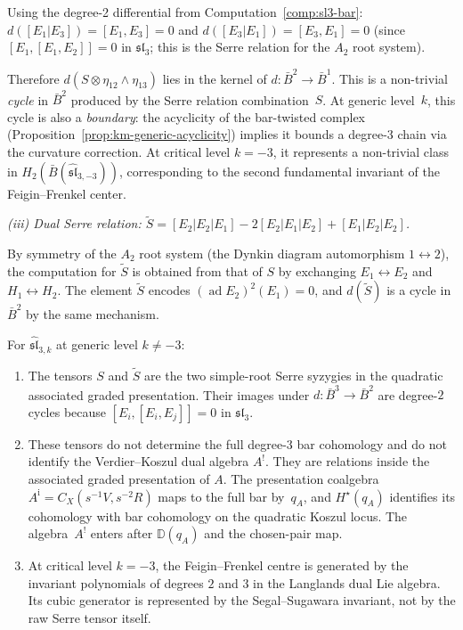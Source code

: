 \begin{computation}
Using the degree-2 differential from Computation~\ref{comp:sl3-bar}:
$d([E_1|E_3]) = [E_1, E_3] = 0$ and $d([E_3|E_1]) = [E_3, E_1] = 0$
(since $[E_1, [E_1, E_2]] = 0$ in $\mathfrak{sl}_3$; this is the
Serre relation for the $A_2$ root system).

Therefore $d(S \otimes \eta_{12}\wedge\eta_{13})$ lies in the kernel of
$d\colon \bar{B}^2 \to \bar{B}^1$. This is a non-trivial \emph{cycle}
in $\bar{B}^2$ produced by the Serre relation combination~$S$. At generic
level~$k$, this cycle is also a \emph{boundary}: the acyclicity
of the bar-twisted complex (Proposition~\ref{prop:km-generic-acyclicity})
implies it bounds a degree-3 chain via the curvature correction. At
critical level $k = -3$, it represents a non-trivial class in
$H_2(\bar{B}(\widehat{\mathfrak{sl}}_{3,-3}))$, corresponding to the
second fundamental invariant of the Feigin--Frenkel center.

\emph{(iii) Dual Serre relation:
$\tilde{S} = [E_{2}|E_{2}|E_{1}] - 2[E_{2}|E_{1}|E_{2}]
+ [E_{1}|E_{2}|E_{2}]$.}

By symmetry of the $A_2$ root system (the Dynkin diagram automorphism
$1 \leftrightarrow 2$), the computation for $\tilde{S}$ is obtained from
that of $S$ by exchanging $E_1 \leftrightarrow E_2$ and
$H_1 \leftrightarrow H_2$. The element $\tilde{S}$ encodes
$(\operatorname{ad} E_2)^2(E_1) = 0$, and $d(\tilde{S})$ is a cycle
in $\bar{B}^2$ by the same mechanism.
\end{computation}

\begin{proposition}
\label{prop:sl3-serre-cohomology}
For $\widehat{\mathfrak{sl}}_{3,k}$ at generic level $k \neq -3$:
\begin{enumerate}[label=\textup{(\roman*)}]
\item The tensors $S$ and $\tilde S$ are the two simple-root Serre
syzygies in the quadratic associated graded presentation. Their
images under $d\colon \bar{B}^3\to\bar{B}^2$ are degree-$2$ cycles
because $[E_i,[E_i,E_j]]=0$ in $\mathfrak{sl}_3$.
\item These tensors do not determine the full degree-$3$ bar
cohomology and do not identify the Verdier--Koszul dual algebra
$A^!$. They are relations inside the associated graded presentation
of $A$.  The presentation coalgebra
$A^{\mathrm i}=C_X(s^{-1}V,s^{-2}R)$ maps to the full bar by~$q_A$,
and $H^\star(q_A)$ identifies its cohomology with bar cohomology on
the quadratic Koszul locus. The algebra~$A^!$ enters after
$\mathbb D(q_A)$ and the chosen-pair map.
\item At critical level $k=-3$, the Feigin--Frenkel centre is generated
by the invariant polynomials of degrees $2$ and $3$ in the Langlands
dual Lie algebra. Its cubic generator is represented by the
Segal--Sugawara invariant, not by the raw Serre tensor itself.
\end{enumerate}
\end{proposition}

